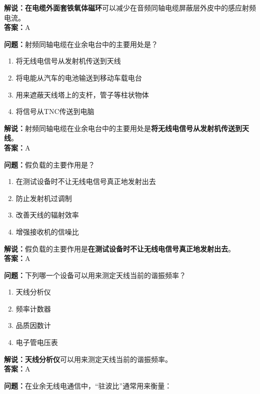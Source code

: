 \textbf{解说：}\textbf{在电缆外面套铁氧体磁环}可以减少在音频同轴电缆屏蔽层外皮中的感应射频电流。\\\textbf{答案：}A



\textbf{问题：}射频同轴电缆在业余电台中的主要用处是？

\begin{enumerate}[label=\Alph*), leftmargin=1cm]
	\item 将无线电信号从发射机传送到天线
	\item 将电能从汽车的电池输送到移动车载电台
	\item 用来遮蔽天线塔上的支杆，管子等柱状物体
	\item 将信号从TNC传送到电脑
\end{enumerate}

\textbf{解说：}射频同轴电缆在业余电台中的主要用处是\textbf{将无线电信号从发射机传送到天线}。\\\textbf{答案：}A



\textbf{问题：}假负载的主要作用是？

\begin{enumerate}[label=\Alph*), leftmargin=1cm]
	\item 在测试设备时不让无线电信号真正地发射出去
	\item 防止发射机过调制
	\item 改善天线的辐射效率
	\item 增强接收机的信噪比
\end{enumerate}

\textbf{解说：}假负载的主要作用是\textbf{在测试设备时不让无线电信号真正地发射出去}。\\\textbf{答案：}A



\textbf{问题：}下列哪一个设备可以用来测定天线当前的谐振频率？

\begin{enumerate}[label=\Alph*), leftmargin=1cm]
	\item 天线分析仪
	\item 频率计数器
	\item 品质因数计
	\item 电子管电压表
\end{enumerate}

\textbf{解说：}\textbf{天线分析仪}可以用来测定天线当前的谐振频率。\\\textbf{答案：}A



\textbf{问题：}在业余无线电通信中，“驻波比”通常用来衡量：

